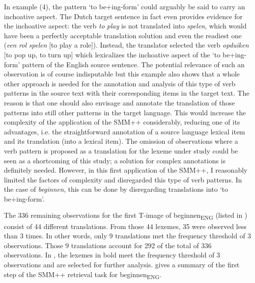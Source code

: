 In example (4), the pattern ‘to be+ing-form’ could arguably be said to carry an inchoative aspect. The Dutch target sentence in fact even provides evidence for the inchoative aspect: the verb \textit{to} \textit{play} is not translated into \textit{spelen}, which would have been a perfectly acceptable translation solution and even the readiest one (\textit{een} \textit{rol} \textit{spelen} [to play a role]). Instead, the translator selected the verb \textit{opduiken} [to pop up, to turn up] which lexicalizes the inchoative aspect of the ‘to be+ing-form’ pattern of the English source sentence. The potential relevance of such an observation is of course indisputable but this example also shows that a whole other approach is needed for the annotation and analysis of this type of verb patterns in the source text with their corresponding items in the target text. The reason is that one should also envisage and annotate the translation of those patterns into still other patterns in the target language. This would increase the complexity of the application of the SMM++ considerably, reducing one of its advantages, i.e. the straightforward annotation of a source language lexical item and its translation (into a lexical item). The omission of observations where a verb pattern is proposed as a translation for the lexeme under study could be seen as a shortcoming of this study; a solution for complex annotations is definitely needed. However, in this first application of the SMM++, I reasonably limited the factors of complexity and disregarded this type of verb patterns. In the case of \textit{beginnen}, this can be done by disregarding translations into ‘to be+ing-form’.

The 336 remaining observations for the first T-image of beginnen\textsubscript{ENG} (listed in ) consist of 44 different translations. From those 44 lexemes, 35 were observed less than 3 times. In other words, only 9 translations met the frequency threshold of 3 observations. Those 9 translations account for 292 of the total of 336 observations. In , the lexemes in bold meet the frequency threshold of 3 observations and are selected for further analysis.  gives a summary of the first step of the SMM++ retrieval task for beginnen\textsubscript{ENG}.


